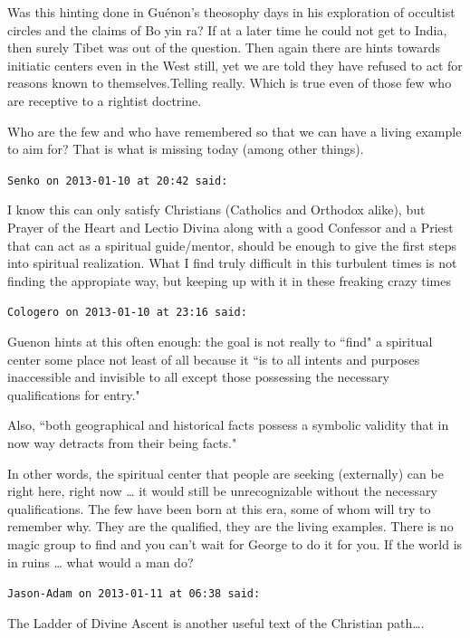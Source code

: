 \begin{footnotesize}
\begin{sffamily}
Was this hinting done in Guénon's theosophy days in his exploration of occultist circles and the claims of Bo yin ra? If at a later time he could not get to India, then surely Tibet was out of the question. Then again there are hints towards initiatic centers even in the West still, yet we are told they have refused to act for reasons known to themselves.Telling really. Which is true even of those few who are receptive to a rightist doctrine. 

Who are the few and who have remembered so that we can have a living example to aim for? That is what is missing today (among other things).


\hfill

\texttt{Senko on 2013-01-10 at 20:42 said: }

I know this can only satisfy Christians (Catholics and Orthodox alike), but Prayer of the Heart and Lectio Divina along with a good Confessor and a Priest that can act as a spiritual guide/mentor, should be enough to give the first steps into spiritual realization. What I find truly difficult in this turbulent times is not finding the appropiate way, but keeping up with it in these freaking crazy times


\hfill

\texttt{Cologero on 2013-01-10 at 23:16 said: }

Guenon hints at this often enough: the goal is not really to ``find" a spiritual center some place not least of all because it ``is to all intents and purposes inaccessible and invisible to all except those possessing the necessary qualifications for entry."

Also, ``both geographical and historical facts possess a symbolic validity that in now way detracts from their being facts."

In other words, the spiritual center that people are seeking (externally) can be right here, right now … it would still be unrecognizable without the necessary qualifications. The few have been born at this era, some of whom will try to remember why. They are the qualified, they are the living examples. There is no magic group to find and you can't wait for George to do it for you. If the world is in ruins … what would a man do?


\hfill

\texttt{Jason-Adam on 2013-01-11 at 06:38 said: }

The Ladder of Divine Ascent is another useful text of the Christian path….


\hfill


\end{sffamily}
\end{footnotesize}
